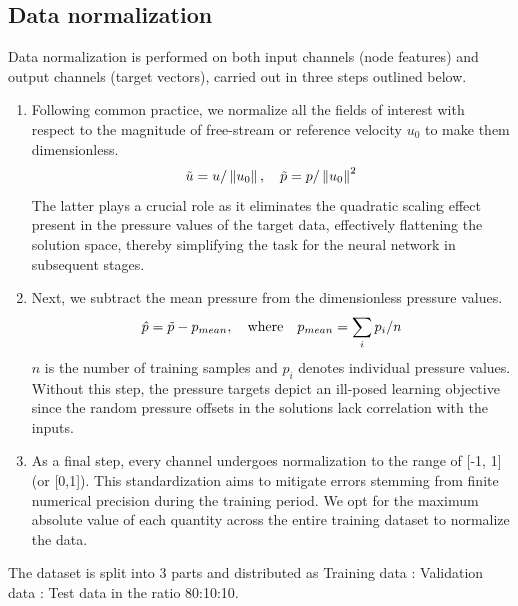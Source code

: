 \subsection{Data normalization}
Data normalization is performed on both input channels (node features) and output channels (target vectors), carried out in three steps outlined below.
\begin{enumerate}
\item Following common practice, we normalize all the fields of interest with respect to the magnitude of free-stream or reference velocity $u_0$ to make them dimensionless. 
\begin{equation}
    \Tilde{u}=u /\left\|u_0\right\|, \quad \Tilde{p}=p /\left\|u_0\right\|^2
\end{equation}
The latter plays a crucial role as it eliminates the quadratic scaling effect present in the pressure values of the target data, effectively flattening the solution space, thereby simplifying the task for the neural network in subsequent stages.
\item Next, we subtract the mean pressure from the dimensionless pressure values. 
\begin{equation}
\hat{p} = \Tilde{p} - p_{mean} , \quad \text{where} \quad p_{mean} = \sum_i p_i / n
\end{equation}
$n$ is the number of training samples and $p_i$ denotes individual pressure values. Without this step, the pressure targets depict an ill-posed learning objective since the random pressure offsets in the solutions lack correlation with the inputs.
\item As a final step, every channel undergoes normalization to the range of [-1, 1] (or [0,1]). This standardization aims to mitigate errors stemming from finite numerical precision during the training period. We opt for the maximum absolute value of each quantity across the entire training dataset to normalize the data. 
\end{enumerate}
The dataset is split into 3 parts and distributed as Training data : Validation data : Test data in the ratio 80:10:10. 
